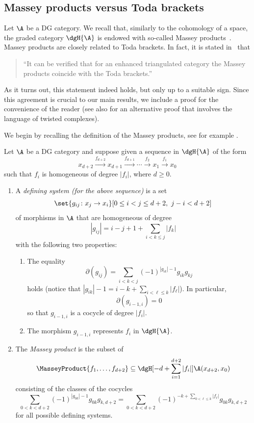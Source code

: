 \documentclass[a4paper]{amsart}
\begin{document}
\subsection{Massey products versus Toda brackets}

Let $\A$ be a DG category. We recall that, similarly to the cohomology of a
space, the graded category $\dgH{\A}$ is endowed with so-called Massey
products~\cite[Sec.~5.A]{BK90}. Massey products are closely related to Toda
brackets. In fact, it is stated in \loccit~that
\begin{quote}
  ``It can be verified that for an enhanced triangulated category the Massey
  products coincide with the Toda brackets.''
\end{quote}
As it turns out, this statement indeed holds, but only up to a suitable sign.
Since this agreement is crucial to our main results, we include a proof for the
convenience of the reader (see also \cite{Bod14} for an alternative proof that
involves the language of twisted complexes).

We begin by recalling the definition of the Massey products, see for example
\cite{May69}.

\begin{definition}
  \label{def:MasseyProduct}
  Let $\A$ be a DG category and suppose given a sequence in $\dgH{\A}$ of the
  form
  \[
    x_{d+2}\xrightarrow{f_{d+2}}x_{d+1}\xrightarrow{f_{d+1}}\cdots\xrightarrow{f_2}x_1\xrightarrow{f_1}x_0
  \]
  such that $f_i$ is homogeneous of degree $|f_i|$, where $d\geq0$.
  \begin{enumerate}
  \item A \emph{defining system (for the above sequence)} is a set
    \[
      \set{g_{ij}\colon x_j\to x_i}[0\leq i<j\leq d+2,\ j-i<d+2]
    \]
    of morphisms in $\A$ that are homogeneous of degree
    \[
      |g_{ij}|=i-j+1+\sum_{i<k\leq j}|f_k|
    \]
    with the following two properties:
    \begin{enumerate}
    \item The equality
        $$\partial(g_{ij})=\sum_{i<k<j}(-1)^{|g_{ik}|-1}g_{ik}g_{kj}$$
      holds (notice that $|g_{ik}|-1=i-k+\sum_{i<\ell\leq k}|f_\ell|$). In
      particular,
      \[
        \partial(g_{i-1,i})=0 \] so that $g_{i-1,i}$ is a cocycle of degree
      $|f_i|$. \item The morphism $g_{i-1,i}$ represents $f_i$ in $\dgH{\A}$.
    \end{enumerate}
  \item The \emph{Massey product} is the subset of
    \[
      \MasseyProduct{f_1,\dots,f_{d+2}}\subseteq\dgH[-d+\sum_{i=1}^{d+2}|f_i|]{\A(x_{d+2},x_0)}
    \]
    consisting of the classes of the cocycles
    \[
      \sum_{0<k< d+2}(-1)^{|g_{0k}|-1}g_{0k}g_{k,d+2}=\sum_{0<k<
        d+2}(-1)^{-k+\sum_{0<\ell\leq k}|f_\ell|}g_{0k}g_{k,d+2}
    \]
    for all possible defining systems.
  \end{enumerate}
\end{definition}
\end{document}

